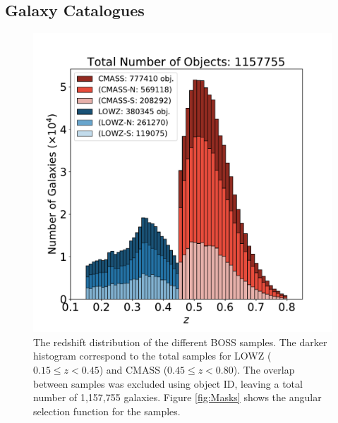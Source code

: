 \subsection{Galaxy Catalogues}
  \begin{figure}
  \vspace{-30pt}
  \begin{center}
      \includegraphics[scale=0.450]{BOSS-FIGS/Nz_BOSS}
      \caption[The redshift distribution of the different BOSS samples.]{The redshift distribution of the different BOSS samples. The darker histogram correspond to the total samples for LOWZ ($0.15\leq z <0.45$) and CMASS ($0.45\leq z < 0.80$). The overlap between samples was excluded using object ID, leaving a total number of 1,157,755 galaxies. Figure \ref{fig:Masks} shows the angular selection function for the samples.}
      \label{fig:NZ_BOSS}
      \end{center}
  \end{figure}
